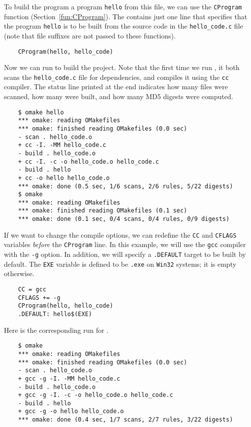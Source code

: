 To build the program a program \verb+hello+ from this file, we can use the
\verb+CProgram+ function (Section~\ref{fun:CProgram}).
The  contains just one line that specifies that the program \verb+hello+ is
to be built from the source code in the \verb+hello_code.c+ file (note that file suffixes
are not passed to these functions).

\begin{verbatim}
    CProgram(hello, hello_code)
\end{verbatim}

Now we can run  to build the project.  Note that the first time we run ,
it both scans the \verb+hello_code.c+ file for dependencies, and compiles it using the \verb+cc+
compiler.  The status line printed at the end indicates how many files were scanned, how many
were built, and how many MD5 digests were computed.

\begin{verbatim}
    $ omake hello
    *** omake: reading OMakefiles
    *** omake: finished reading OMakefiles (0.0 sec)
    - scan . hello_code.o
    + cc -I. -MM hello_code.c
    - build . hello_code.o
    + cc -I. -c -o hello_code.o hello_code.c
    - build . hello
    + cc -o hello hello_code.o
    *** omake: done (0.5 sec, 1/6 scans, 2/6 rules, 5/22 digests)
    $ omake
    *** omake: reading OMakefiles
    *** omake: finished reading OMakefiles (0.1 sec)
    *** omake: done (0.1 sec, 0/4 scans, 0/4 rules, 0/9 digests)
\end{verbatim}

If we want to change the compile options, we can redefine the \verb+CC+ and \verb+CFLAGS+
variables \emph{before} the \verb+CProgram+ line.  In this example, we will use the \verb+gcc+
compiler with the \verb+-g+ option.  In addition, we will specify a \verb+.DEFAULT+ target
to be built by default.  The \verb+EXE+ variable is defined to be \verb+.exe+ on \verb+Win32+
systems; it is empty otherwise.

\begin{verbatim}
    CC = gcc
    CFLAGS += -g
    CProgram(hello, hello_code)
    .DEFAULT: hello$(EXE)
\end{verbatim}

Here is the corresponding run for .

\begin{verbatim}
    $ omake
    *** omake: reading OMakefiles
    *** omake: finished reading OMakefiles (0.0 sec)
    - scan . hello_code.o
    + gcc -g -I. -MM hello_code.c
    - build . hello_code.o
    + gcc -g -I. -c -o hello_code.o hello_code.c
    - build . hello
    + gcc -g -o hello hello_code.o
    *** omake: done (0.4 sec, 1/7 scans, 2/7 rules, 3/22 digests)
\end{verbatim}

